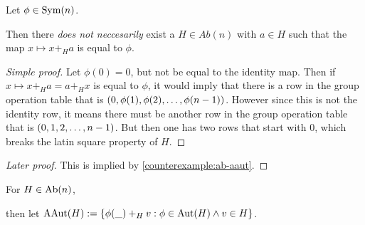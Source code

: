 \begin{counterexample} \label{counterexample:construction-early-ab-destroy}
    Let \( \phi \in \operatorname{Sym}(n) \).

    Then there \emph{does not neccesarily} exist a \( H \in Ab(n) \) with \( a \in H \) such that the map  \( x \mapsto  x +_H a \) is equal to \( \phi \).
\end{counterexample}
\begin{proof}[Simple proof]
    Let \( \phi(0) = 0 \), but not be equal to the identity map. Then if \( x \mapsto x +_H a = a +_H x \) is equal to \( \phi \), it would imply that there is a row in the group operation table that is  \( \left( 0, \phi(1), \phi(2), \dots, \phi(n-1) \right) \). However since this is not the identity row, it means there must be another row in the group operation table that is \( \left( 0, 1, 2, \dots, n-1 \right) \). But then one has two rows that start with \( 0 \), which breaks the latin square property of \( H \).
\end{proof}
\begin{proof}[Later proof]
    This is implied by \autoref{counterexample:ab-aaut}.
\end{proof}

\begin{definition} \label{def:abelian-aaut}
    For \( H \in \operatorname{Ab}(n) \),

    then let \( \operatorname{AAut}(H) := \left\{ \phi(\_) +_H v : \phi \in \operatorname{Aut}(H) \land v \in H \right\} \).
\end{definition}

